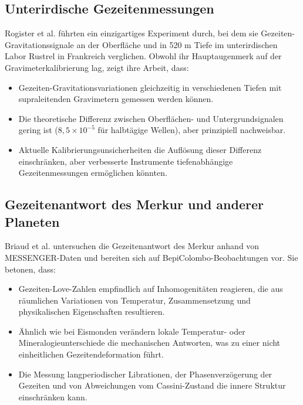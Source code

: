 \documentclass[12pt,a4paper]{article}
\theoremstyle{remark}
\begin{document}
	\subsection{Unterirdische Gezeitenmessungen}
	
	Rogister et al. \cite{Rogister2024} führten ein einzigartiges Experiment durch, bei dem sie Gezeiten-Gravitationssignale an der Oberfläche und in 520 m Tiefe im unterirdischen Labor Rustrel in Frankreich verglichen. Obwohl ihr Hauptaugenmerk auf der Gravimeterkalibrierung lag, zeigt ihre Arbeit, dass:
	
	\begin{itemize}
		\item Gezeiten-Gravitationsvariationen gleichzeitig in verschiedenen Tiefen mit supraleitenden Gravimetern gemessen werden können.
		\item Die theoretische Differenz zwischen Oberflächen- und Untergrundsignalen gering ist (\(8,5 \times 10^{-5}\) für halbtägige Wellen), aber prinzipiell nachweisbar.
		\item Aktuelle Kalibrierungsunsicherheiten die Auflösung dieser Differenz einschränken, aber verbesserte Instrumente tiefenabhängige Gezeitenmessungen ermöglichen könnten.
	\end{itemize}
	
	\subsection{Gezeitenantwort des Merkur und anderer Planeten}
	
	Briaud et al. \cite{Briaud2025} untersuchen die Gezeitenantwort des Merkur anhand von MESSENGER-Daten und bereiten sich auf BepiColombo-Beobachtungen vor. Sie betonen, dass:
	
	\begin{itemize}
		\item Gezeiten-Love-Zahlen empfindlich auf Inhomogenitäten reagieren, die aus räumlichen Variationen von Temperatur, Zusammensetzung und physikalischen Eigenschaften resultieren.
		\item Ähnlich wie bei Eismonden verändern lokale Temperatur- oder Mineralogieunterschiede die mechanischen Antworten, was zu einer nicht einheitlichen Gezeitendeformation führt.
		\item Die Messung langperiodischer Librationen, der Phasenverzögerung der Gezeiten und von Abweichungen vom Cassini-Zustand die innere Struktur einschränken kann.
	\end{itemize}
	
\end{document}
